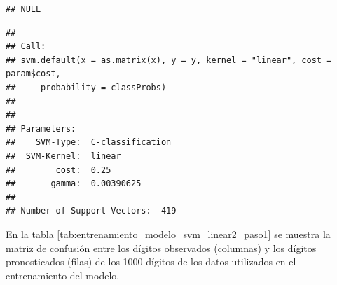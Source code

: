 \documentclass[12pt,spanish,a4paper]{article}
\newenvironment{Shaded}{\begin{snugshade}}{\end{snugshade}}
\newcommand{\OperatorTok}[1]{\textcolor[rgb]{0.81,0.36,0.00}{\textbf{#1}}}
\newcommand{\NormalTok}[1]{#1}
\numberwithin{equation}{section}
\begin{document}
\begin{Shaded}
\end{Shaded}

\begin{verbatim}
## NULL
\end{verbatim}

\begin{Shaded}
\end{Shaded}

\begin{verbatim}
## 
## Call:
## svm.default(x = as.matrix(x), y = y, kernel = "linear", cost = param$cost, 
##     probability = classProbs)
## 
## 
## Parameters:
##    SVM-Type:  C-classification 
##  SVM-Kernel:  linear 
##        cost:  0.25 
##       gamma:  0.00390625 
## 
## Number of Support Vectors:  419
\end{verbatim}

En la tabla \ref{tab:entrenamiento_modelo_svm_linear2_paso1} se muestra
la matriz de confusión entre los dígitos observados (columnas) y los
dígitos pronosticados (filas) de los 1000 dígitos de los datos
utilizados en el entrenamiento del modelo.

\begin{table}[ht]
\centering
{}
\caption{Matriz de confusión entre los dígitos observados y los dígitos pronosticados por el modelo.} 
\label{tab:entrenamiento_modelo_svm_linear2_paso1}
\end{table}
\end{document}
